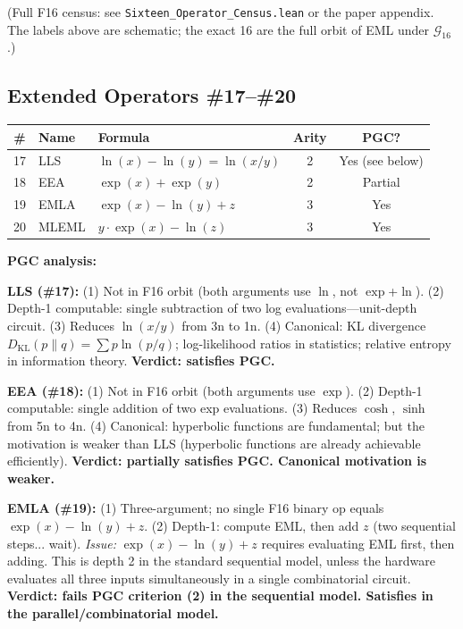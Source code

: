\documentclass[11pt]{article}
\begin{document}
\noindent (Full F16 census: see \texttt{Sixteen\_Operator\_Census.lean} or
the paper appendix. The labels above are schematic; the exact 16 are the
full orbit of EML under $\mathcal{G}_{16}$.)

\subsection{Extended Operators \#17--\#20}

\begin{longtable}{cllcc}
\toprule
\# & Name & Formula & Arity & PGC? \\
\midrule
17 & LLS   & $\ln(x) - \ln(y) = \ln(x/y)$ & 2 & Yes (see below) \\
18 & EEA   & $\exp(x) + \exp(y)$          & 2 & Partial \\
19 & EMLA  & $\exp(x) - \ln(y) + z$       & 3 & Yes \\
20 & MLEML & $y \cdot \exp(x) - \ln(z)$   & 3 & Yes \\
\bottomrule
\end{longtable}

\noindent \textbf{PGC analysis:}

\medskip
\textbf{LLS (\#17):}
(1) Not in F16 orbit (both arguments use $\ln$, not $\exp$+$\ln$).
(2) Depth-1 computable: single subtraction of two log evaluations---unit-depth circuit.
(3) Reduces $\ln(x/y)$ from 3n to 1n.
(4) Canonical: KL divergence $D_\mathrm{KL}(p\|q) = \sum p \ln(p/q)$;
log-likelihood ratios in statistics; relative entropy in information theory.
\textbf{Verdict: satisfies PGC.}

\medskip
\textbf{EEA (\#18):}
(1) Not in F16 orbit (both arguments use $\exp$).
(2) Depth-1 computable: single addition of two exp evaluations.
(3) Reduces $\cosh$, $\sinh$ from 5n to 4n.
(4) Canonical: hyperbolic functions are fundamental; but the motivation
is weaker than LLS (hyperbolic functions are already achievable efficiently).
\textbf{Verdict: partially satisfies PGC. Canonical motivation is weaker.}

\medskip
\textbf{EMLA (\#19):}
(1) Three-argument; no single F16 binary op equals $\exp(x)-\ln(y)+z$.
(2) Depth-1: compute EML, then add $z$ (two sequential steps... wait).
\emph{Issue:} $\exp(x) - \ln(y) + z$ requires evaluating EML first, then adding.
This is depth 2 in the standard sequential model, unless the hardware
evaluates all three inputs simultaneously in a single combinatorial circuit.
\textbf{Verdict: fails PGC criterion (2) in the sequential model.
Satisfies in the parallel/combinatorial model.}
\end{document}
